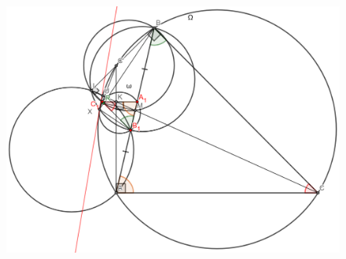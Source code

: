 \documentclass[a4paper,14pt,russian,oneside]{extarticle}
\begin{document}
\begin{enumerate}
{ 	\begin{figure}[ht!]
		\centering
		\includegraphics[width=150mm]{images/6.png}
		\caption{\label{image6}}
	\end{figure}
	}
\end{enumerate}
\end{document}
